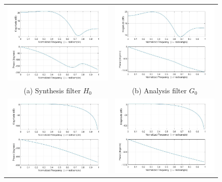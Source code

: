 \begin{figure}[htpb]
\centering
\begin{tabular}{cc}
  \includegraphics[trim={0 0 0 9.3cm}, clip, width=75mm]{H0.jpg} & \includegraphics[trim={0 0 0 9.3cm}, clip,width=75mm]{G0.jpg} \\
(a) Synthesis filter $H_0$ & (b) Analysis filter $G_0$ \\[6pt]
 \includegraphics[trim={0 0 0 9.3cm}, clip,width=75mm]{H1.jpg} & \includegraphics[trim={0 0 0 9.3cm}, clip,width=75mm]{G1.jpg} \\

\end{tabular}
\end{figure}
